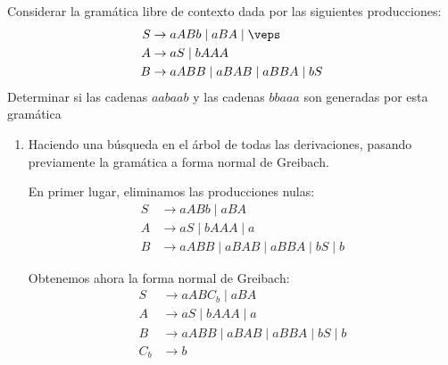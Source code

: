 \begin{ejercicio}\label{ej:1.6.5}
    Considerar la gramática libre de contexto dada por las siguientes producciones:
    \begin{align*}
        S &\rightarrow aABb \mid aBA \mid \veps \\
        A &\rightarrow aS \mid bAAA \\
        B &\rightarrow aABB \mid aBAB \mid aBBA \mid bS
    \end{align*}
    Determinar si las cadenas $aabaab$ y las cadenas $bbaaa$ son generadas por esta gramática
    \begin{enumerate}
        \item Haciendo una búsqueda en el árbol de todas las derivaciones, pasando previamente la gramática a forma normal de Greibach.
        
        En primer lugar, eliminamos las producciones nulas:
        \begin{align*}
            S &\rightarrow aABb \mid aBA \\
            A &\rightarrow aS \mid bAAA \mid a\\
            B &\rightarrow aABB \mid aBAB \mid aBBA \mid bS \mid b
        \end{align*}

        Obtenemos ahora la forma normal de Greibach:
        \begin{align*}
            S &\rightarrow aABC_b \mid aBA \\
            A &\rightarrow aS \mid bAAA \mid a\\
            B &\rightarrow aABB \mid aBAB \mid aBBA \mid bS \mid b\\
            C_b &\rightarrow b
        \end{align*}


\end{enumerate}
\end{ejercicio}
